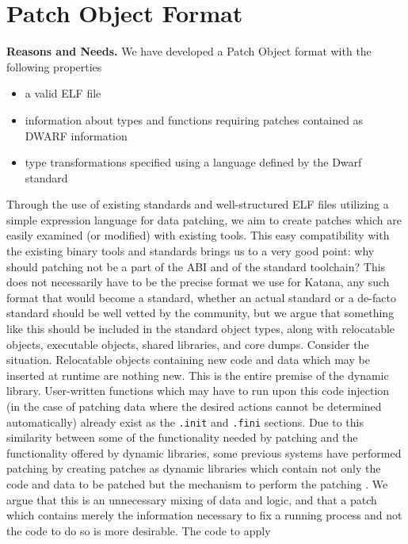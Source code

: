 \section{Patch Object Format}
\label{sec:poformat}
{\bf Reasons and Needs.}
We have developed a Patch Object format with the following properties
\begin{itemize}
 \item a valid ELF file
 \item information about types and functions requiring patches contained
   as DWARF information
 \item type transformations specified using a language defined by the
   Dwarf standard
\end{itemize}
Through the use of existing standards and well-structured ELF files
utilizing a simple expression language for data patching, we aim to
create patches which are easily examined (or modified) with existing
tools. This easy compatibility with the existing binary tools and
standards brings us to a very good point: why should patching not be a
part of the ABI and of the standard toolchain? This does not
necessarily have to be the precise format we use for Katana, any such
format that would become a standard, whether an actual standard or a
de-facto standard should be well vetted by the community, but we argue
that something like this should be included in the standard object
types, along with relocatable objects, executable objects, shared
libraries, and core dumps. Consider the situation. Relocatable objects
containing new code and data which may be inserted at runtime are
nothing new. This is the entire premise of the dynamic
library. User-written functions which may have to run upon this code
injection (in the case of patching data where the desired actions
cannot be determined automatically) already exist as the
\texttt{.init} and \texttt{.fini} sections. Due to this similarity
between some of the functionality needed by patching and the
functionality offered by dynamic
libraries, some previous systems have performed patching by creating
patches as dynamic libraries which contain not only the code and data
to be patched but the mechanism to perform the patching \cite{ginseng}
\cite{polus}. We argue that
this is an unnecessary mixing of data and logic, and that a patch
which contains merely the information necessary to fix a running
process and not the code to do so is more desirable. The code to apply

